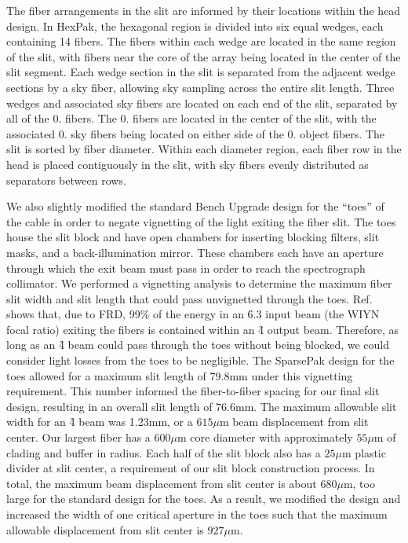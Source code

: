 The fiber arrangements in the slit are informed by their locations within the
head design.  In HexPak, the hexagonal region is divided into six equal
wedges, each containing 14 fibers.  The fibers within each wedge are located
in the same region of the slit, with fibers near the core of the array being
located in the center of the slit segment.  Each wedge section in the slit is
separated from the adjacent wedge sections by a sky fiber, allowing sky
sampling across the entire slit length.  Three wedges and associated sky
fibers are located on each end of the slit, separated by all of the 0.
fibers.  The 0. fibers are located in the center of the slit, with the
associated 0. sky fibers being located on either side of the
0. object fibers.  The \GP slit is sorted by fiber diameter.
Within each diameter region, each fiber row in the head is placed contiguously
in the slit, with sky fibers evenly distributed as separators between rows.


We also slightly modified the standard Bench Upgrade design for the ``toes''
of the cable in order to negate vignetting of the light exiting the fiber
slit.  The toes house the slit block and have open chambers for inserting
blocking filters, slit masks, and a back-illumination mirror.  These chambers
each have an aperture through which the exit beam must pass in order to reach
the spectrograph collimator.  We performed a vignetting analysis to determine
the maximum fiber slit width and slit length that could pass unvignetted
through the toes.  Ref.~ shows that, due to FRD, 99\% of
the energy in an \f6.3 input beam (the WIYN focal ratio) exiting the fibers is
contained within an \f4 output beam.  Therefore, as long as an \f4 beam could
pass through the toes without being blocked, we could consider light losses
from the toes to be negligible.  The SparsePak design for the toes allowed for
a maximum slit length of 79.8mm under this vignetting requirement.  This
number informed the fiber-to-fiber spacing for our final slit design,
resulting in an overall slit length of 76.6mm.  The maximum allowable slit
width for an \f4 beam was 1.23mm, or a $615\mu$m beam displacement from slit
center.  Our largest fiber has a $600\mu$m core diameter with approximately
$55\mu$m of clading and buffer in radius.  Each half of the slit block also
has a $25\mu$m plastic divider at slit center, a requirement of our slit block
construction process.  In total, the maximum beam displacement from slit
center is about $680\mu$m, too large for the standard design for the toes.  As
a result, we modified the design and increased the width of one critical
aperture in the toes such that the maximum allowable displacement from slit
center is $927\mu$m.


